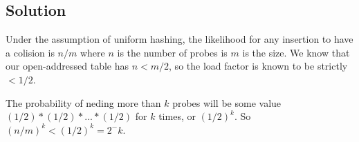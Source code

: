 \subsection*{Solution}

Under the assumption of uniform hashing, the likelihood for any insertion to have a colision is $n/m$ where $n$ is the number of probes is $m$ is the size. We know that our open-addressed table has $n < m/2$, so the load factor is known to be strictly $< 1/2$.

The probability of neding more than $k$ probes will be some value $(1/2)*(1/2)*...*(1/2)$ for $k$ times, or $(1/2)^k$. So $(n/m)^k < (1/2) ^k = 2^-k$.
